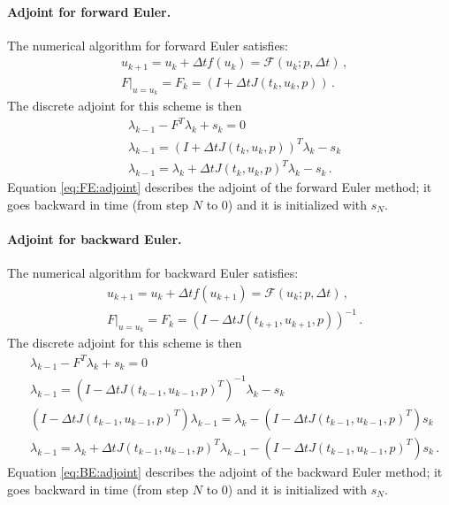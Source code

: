 \documentclass[10pt]{article}
\newcommand{\dt}{\Delta t}
\newcommand{\param}{p}
\newcommand{\ModelN}{{\mathcal{F}}}
\newcommand{\ModelTLM}{F}
\begin{document}
{\paragraph{Adjoint for forward Euler.} The numerical algorithm for
forward Euler satisfies:
%
\begin{align}
  \label{eq:FE}
  &u_{k+1}=u_k + \dt f(u_k)= \ModelN(u_k;\param,\dt)\,,\\
  \nonumber
  &\left. \ModelTLM \right|_{u=u_k} =\ModelTLM_k = (I + \dt
  J(t_k,u_k,\param))\,.
\end{align}
%
The discrete adjoint for this scheme is then
%
\begin{align}
\nonumber
&\lambda_{k-1}   -  \ModelTLM^T \lambda_k + s_k =0
\\
\nonumber
&\lambda_{k-1} = \left(I + \dt J(t_{k},u_{k},\param) \right)^T \lambda_k -
s_k
\\
\label{eq:FE:adjoint}
&\lambda_{k-1} =  \lambda_k + \dt J(t_k,u_k,\param)^T \lambda_k - s_k\,.
\end{align}
%
Equation \eqref{eq:FE:adjoint} describes the adjoint of the forward
Euler method; it goes backward in time (from step $N$ to $0$) and it
is initialized with $s_N$.


\paragraph{Adjoint for backward Euler.} The numerical algorithm for
backward Euler satisfies:
%
\begin{align}
  \label{eq:BE}
  &u_{k+1}=u_k + \dt f(u_{k+1})= \ModelN(u_k;\param,\dt)\,,\\
  \nonumber
  &\left. \ModelTLM \right|_{u=u_k} =\ModelTLM_k = \left(I - \dt
  J(t_{k+1},u_{k+1},\param)\right)^{-1}\,.
\end{align}
%
The discrete adjoint for this scheme is then
%
\begin{align}
\nonumber
&\lambda_{k-1}   -  \ModelTLM^T \lambda_k + s_k =0
\\
\nonumber
&\lambda_{k-1} = \left(I - \dt J(t_{k-1},u_{k-1},\param)^T \right)^{-1} \lambda_k -
s_k
\\
\nonumber
&\left(I - \dt J(t_{k-1},u_{k-1},\param)^T \right) \lambda_{k-1} = \lambda_k -
\left(I - \dt J(t_{k-1},u_{k-1},\param)^T \right) s_k\\
\label{eq:BE:adjoint}
& \lambda_{k-1} = \lambda_k + \dt J(t_{k-1},u_{k-1},\param)^T
\lambda_{k-1} -
\left(I - \dt J(t_{k-1},u_{k-1},\param)^T \right) s_k\,.
\end{align}
%
Equation \eqref{eq:BE:adjoint} describes the adjoint of the backward
Euler method; it goes backward in time (from step $N$ to $0$) and it
is initialized with $s_N$.

}
\end{document}
